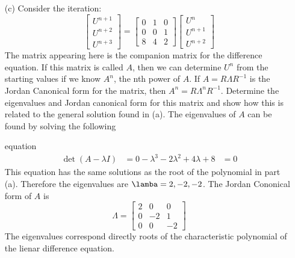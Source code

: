 \documentclass[11pt, oneside, titlepage]{article}
\begin{document}
\begin{enumerate}
\begin{enumerate}
            \item[(c)]
                Consider the iteration:
                \[
                    \begin{bmatrix}
                        U^{n+1} \\
                        U^{n+2} \\
                        U^{n+3}
                    \end{bmatrix}
                    =
                    \begin{bmatrix}
                        0 & 1 & 0 \\
                        0 & 0 & 1 \\
                        8 & 4 & 2
                    \end{bmatrix}
                    \begin{bmatrix}
                        U^n \\
                        U^{n+1} \\
                        U^{n+2}
                    \end{bmatrix}
                \]
                The matrix appearing here is the companion matrix for the
                difference equation.
                If this matrix is called $A$, then we can determine $U^n$ from
                the starting values if we know $A^n$, the nth power of $A$.
                If $A = R\Lambda R^{-1}$ is the Jordan Canonical form for the
                matrix, then $A^n = R\Lambda^n R^{-1}$.
                Determine the eigenvalues and Jordan canonical form for this
                matrix and show how this is related to the general solution
                found in (a).
                The eigenvalues of $A$ can be found by solving the following

                equation
                \begin{align*}
                    \det(A - \lambda I) &= 0
                    -\lambda^3 - 2\lambda^2 + 4\lambda + 8 &= 0
                \end{align*}
                This equation has the same solutions as the root of the
                polynomial in part (a).
                Therefore the eigenvalues are $\lamba = 2, -2, -2$.
                The Jordan Cononical form of $A$ is
                \[
                    \Lambda =
                    \begin{bmatrix}
                        2 & 0 & 0 \\
                        0 & -2 & 1 \\
                        0 & 0 & -2
                    \end{bmatrix}
                \]
                The eigenvalues correspond directly roots of the characteristic
                polynomial of the lienar difference equation.
        \end{enumerate}


\end{enumerate}
\end{document}
